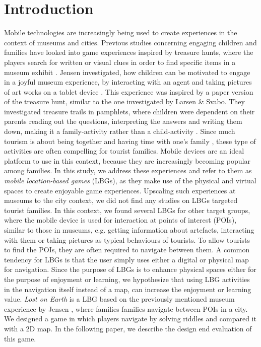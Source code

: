 \section{Introduction}

Mobile technologies are increasingly being used to create experiences in the context of museums and cities. Previous studies concerning engaging children and families have looked into game experiences inspired by treasure hunts, where the players search for written or visual clues in order to find specific items in a museum exhibit \cite{Lynge} \cite{larsen2014tourist}. Jensen investigated, how children can be motivated to engage in a joyful museum experience, by interacting with an agent and taking pictures of art works on a tablet device \cite{Lynge}. This experience was inspired by a paper version of the treasure hunt, similar to the one investigated by Larsen \& Svabo. They investigated treasure trails in pamphlets, where children were dependent on their parents reading out the questions, interpreting the answers and writing them down, making it a family-activity rather than a child-activity \cite{larsen2014tourist}. Since much tourism is about being together and having time with one’s family \cite{larsen2014tourist}, these type of activities are often compelling for tourist families. Mobile devices are an ideal platform to use in this context, because they are increasingly becoming popular among families. In this study, we address these experiences and refer to them as \textit{mobile location-based games} (LBGs), as they make use of the physical and virtual spaces to create enjoyable game experiences. Upscaling such experiences at museums to the city context, we did not find any studies on LBGs targeted tourist families. In this context, we found several LBGs for other target groups, where the mobile device is used for interaction at points of interest (POIs), similar to those in museums, e.g. getting information about artefacts, interacting with them or taking pictures as typical behaviours of tourists. To allow tourists to find the POIs, they are often required to navigate between them. A common tendency for LBGs is that the user simply uses either a digital or physical map for navigation. Since the purpose of LBGs is to enhance physical spaces either for the purpose of enjoyment or learning, we hypothesize that using LBG activities in the navigation itself instead of a map, can increase the enjoyment or learning value.  \textit{Lost on Earth} is a LBG based on the previously mentioned museum experience by Jensen \cite{Lynge}, where families families navigate between POIs in a city. We designed a game in which players navigate by solving riddles and compared it with a 2D map. In the following paper, we describe the design end evaluation of this game. 

